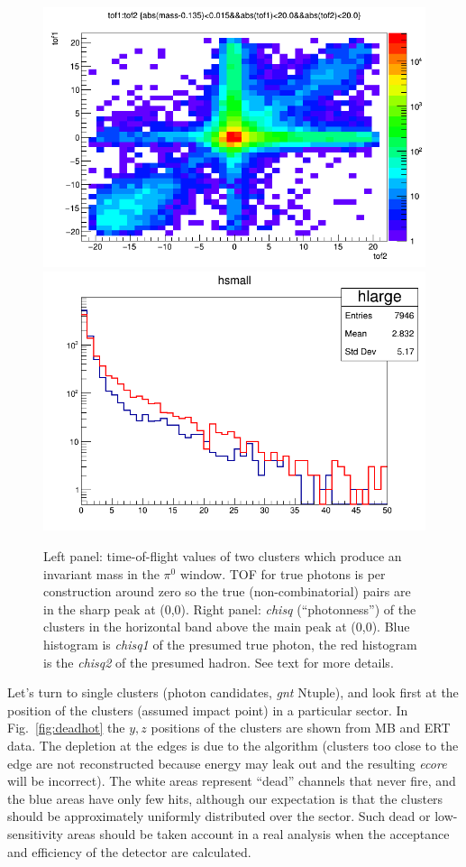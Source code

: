 \documentclass[12pt,letterpaper,aps,prc,superscriptaddress,showpacs,
longbibliography,nofootinbib,floatfix,onecolumn]{revtex4-1}
\newcommand{\piz}{\mbox{$\pi^0$}\xspace}
\begin{document}
\begin{center}
\begin{figure}[htbp]
  \includegraphics[width=0.45\linewidth]{figs/mbtof1tof2.png}
  \includegraphics[width=0.45\linewidth]{figs/mbchi1chi2.png}
  \caption{Left panel: time-of-flight values of two clusters which
    produce an invariant mass in the \piz window.  TOF for true
    photons is per construction around zero so the true
    (non-combinatorial) pairs are in the sharp peak at (0,0).
    Right panel: {\it chisq} (``photonness'') of the clusters in the
    horizontal band above the main peak at (0,0).  Blue histogram is
    {\it chisq1} of the presumed true photon, the red histogram is the
    {\it chisq2} of the presumed hadron.  See text for more details.
  }
    \label{fig:playtof}
\end{figure}
\end{center}


Let's turn to single clusters (photon candidates, {\it gnt} Ntuple),
and look first at the position of the clusters (assumed impact point)
in a particular sector.  In Fig.~\ref{fig:deadhot} the $y,z$ positions
of the clusters are shown from MB and ERT data.  The depletion at the
edges is due to the algorithm (clusters too close to the edge are not
reconstructed because energy may leak out and the resulting 
{\it  ecore} will be incorrect).  The white areas represent ``dead''
channels that never fire, and the blue areas have only few hits,
although our expectation is that the clusters should be approximately
uniformly distributed over the sector.  Such dead or low-sensitivity
areas should be taken account in a real analysis when the acceptance
and efficiency of the detector are calculated.
\end{document}

